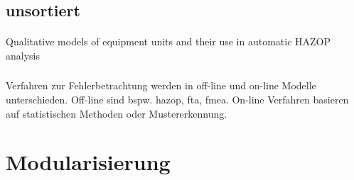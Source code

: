\subsection{unsortiert}
\paragraph*{\cite{Bartolozzi_2000}} Qualitative models of equipment units and their use in automatic {HAZOP} analysis

\subsubsection{\cite{Kavcic_2001}}
Verfahren zur Fehlerbetrachtung werden in off-line und on-line Modelle unterschieden. Off-line sind bspw. \ac{hazop}, \ac{fta}, \ac{fmea}. On-line Verfahren basieren auf statistischen Methoden oder Mustererkennung.  









\section{Modularisierung}
